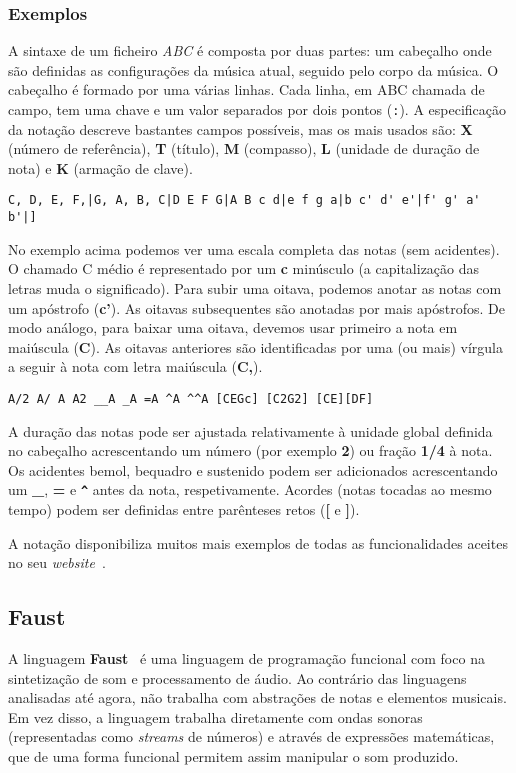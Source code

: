     \subsubsection{Exemplos}
A sintaxe de um ficheiro \textit{ABC} é composta por duas partes: um cabeçalho onde são definidas as configurações da música atual, seguido pelo corpo da música. O cabeçalho é formado por uma várias linhas. Cada linha, em ABC chamada de campo, tem uma chave e um valor separados por dois pontos (\texttt{:}). A especificação da notação descreve bastantes campos possíveis, mas os mais usados são: \textbf{X} (número de referência), \textbf{T} (título), \textbf{M} (compasso), \textbf{L} (unidade de duração de nota) e \textbf{K} (armação de clave).

\begin{lstlisting}[caption={Exemplo da notação ABC}]
C, D, E, F,|G, A, B, C|D E F G|A B c d|e f g a|b c' d' e'|f' g' a' b'|]
\end{lstlisting}

No exemplo acima podemos ver uma escala completa das notas (sem acidentes). O chamado C médio é representado por um \textbf{c} minúsculo (a capitalização das letras muda o significado). Para subir uma oitava, podemos anotar as notas com um apóstrofo (\textbf{c'}). As oitavas subsequentes são anotadas por mais apóstrofos. De modo análogo, para baixar uma oitava, devemos usar primeiro a nota em maiúscula (\textbf{C}). As oitavas anteriores são identificadas por uma (ou mais) vírgula a seguir à nota com letra maiúscula (\textbf{C,}).


\begin{lstlisting}[caption={Exemplo da notação ABC}]
A/2 A/ A A2 __A _A =A ^A ^^A [CEGc] [C2G2] [CE][DF]
\end{lstlisting}
A duração das notas pode ser ajustada relativamente à unidade global definida no cabeçalho acrescentando um número (por exemplo \textbf{2}) ou fração \textbf{1/4} à nota. Os acidentes bemol, bequadro e sustenido podem ser adicionados acrescentando um \textbf{\_}, \textbf{=} e \textbf{\texttt{\textasciicircum{}}} antes da nota, respetivamente. Acordes (notas tocadas ao mesmo tempo) podem ser definidas entre parênteses retos (\textbf{[} e \textbf{]}).

A notação disponibiliza muitos mais exemplos de todas as funcionalidades aceites no seu \textit{website}~\cite{abc-notation-examples}.

\subsection{Faust}
A linguagem \textbf{Faust}~\cite{orlarey:Faust, faust, orlarey:hal-02158894} é uma linguagem de programação funcional com foco na sintetização de som e processamento de áudio. Ao contrário das linguagens analisadas até agora, não trabalha com abstrações de notas e elementos musicais. Em vez disso, a linguagem trabalha diretamente com ondas sonoras (representadas como \textit{streams} de números) e através de expressões matemáticas, que de uma forma funcional permitem assim manipular o som produzido.

